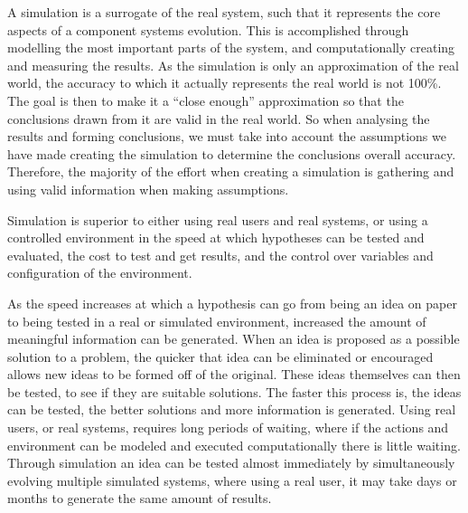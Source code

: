 A simulation is a surrogate of the real system, such that it represents the core aspects of a component systems evolution.
This is accomplished through modelling the most important parts of the system, 
and computationally creating and measuring the results. 
As the simulation is only an approximation of the real world, 
the accuracy to which it actually represents the real world is not 100\%.
The goal is then to make it a ``close enough'' approximation so that the conclusions drawn from it are valid in the real world.
So when analysing the results and forming conclusions, we must take into account the assumptions we have made creating the simulation to determine 
the conclusions overall accuracy.
Therefore, the majority of the effort when creating a simulation is gathering and using valid information when making assumptions.

Simulation is superior to either using real users and real systems, or using a controlled environment in the speed at which hypotheses can be tested and evaluated,
the cost to test and get results, and the control over variables and configuration of the environment.

As the speed increases at which a hypothesis can go from being an idea on paper to being tested in a real or simulated environment, increased the amount of meaningful information can be generated. 
When an idea is proposed as a possible solution to a problem, the quicker that idea can be eliminated or encouraged allows new ideas to be formed off of the original.
These ideas themselves can then be tested, to see if they are suitable solutions.
The faster this process is, the ideas can be tested, the better solutions and more information is generated.
Using real users, or real systems, requires long periods of waiting, where if the actions and environment can be modeled and executed computationally there is little waiting.
Through simulation an idea can be tested almost immediately by simultaneously evolving multiple simulated systems, where using a real user, 
it may take days or months to generate the same amount of results.  


